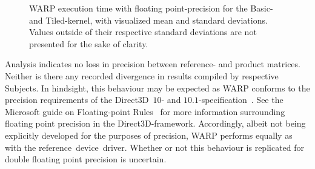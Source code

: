 \begin{figure}[htb]
\begin{center}
	\resizebox{ \columnwidth }{!}{}
	\caption{WARP execution time with floating point-precision for the Basic- and Tiled-kernel, with visualized mean and standard deviations. Values outside of their respective standard deviations are not presented for the sake of clarity.}
	\label{fig:contribution:results:warp:msswarp}
\end{center}
\end{figure}

Analysis indicates no loss in precision between reference- and product matrices.
Neither is there any recorded divergence in results compiled by respective Subjects.
In hindsight, this behaviour may be expected as WARP conforms to the precision requirements of the Direct3D~$10$- and $10.1$-specification~.
See the Microsoft guide on Floating-point Rules~ for more information surrounding floating point precision in the Direct3D-framework.
Accordingly, albeit not being explicitly developed for the purposes of precision, WARP performs equally as with the reference~device~driver.
Whether or not this behaviour is replicated for double floating point precision is uncertain.

